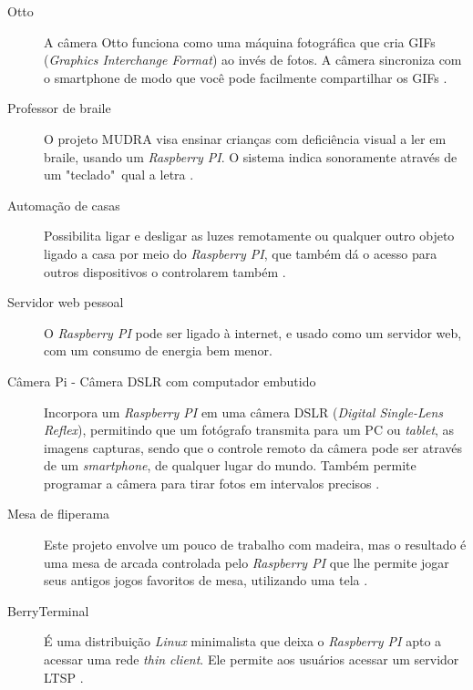 \documentclass[
	12pt,				%
	openright,			%
	twoside,			%
	a4paper,			%
	chapter=TITLE,		%
	english,			%
	brazil				%
	]{abntex2}
\begin{document}
\begin{description}

\item[Otto]A câmera Otto funciona como uma máquina fotográfica que cria GIFs (\textit{Graphics Interchange Format}) ao invés de fotos. A câmera sincroniza com o smartphone de modo que você pode facilmente compartilhar os GIFs \cite{otto}.
  
\item[Professor de braile] O projeto MUDRA visa ensinar crianças com deficiência visual a ler em braile, usando um \textit{Raspberry PI}. O sistema indica sonoramente através de um "teclado"\ qual a  letra \cite{mudra}.

\item[Automação de casas] Possibilita ligar e desligar as luzes remotamente ou qualquer outro objeto ligado a casa por meio do \textit{Raspberry PI}, que também dá o acesso para outros dispositivos o controlarem também \cite{AplicacaoRaspberry}.

\item[Servidor web pessoal] O \textit{Raspberry PI} pode ser ligado à internet, e usado como um servidor web, com um consumo de energia bem menor.


\item[Câmera Pi - Câmera  DSLR com computador embutido] Incorpora um \textit{Raspberry PI} em uma câmera DSLR (\textit{Digital Single-Lens Reflex}), permitindo que um fotógrafo transmita para um PC ou \textit{tablet}, as imagens capturas, sendo que o controle remoto da câmera pode ser através de um \textit{smartphone}, de qualquer lugar do mundo. Também permite programar a câmera para tirar fotos em intervalos precisos \cite{cameraPI}.

\item[Mesa de fliperama] Este projeto envolve um pouco de trabalho com madeira, mas o resultado é uma mesa de arcada controlada pelo \textit{Raspberry PI} que lhe permite jogar seus antigos jogos favoritos de mesa, utilizando uma tela \cite{AplicacaoRaspberry}.

\item[BerryTerminal] É uma distribuição \textit{Linux} minimalista que deixa o \textit{Raspberry PI} apto a acessar uma rede \textit{thin client}. Ele permite aos usuários acessar um servidor LTSP \cite{berryterminal}.

\end{description}


\end{document}
